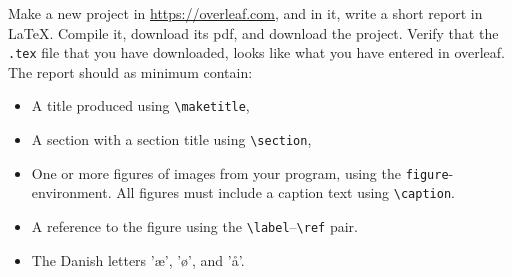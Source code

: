 Make a new project in \url{https://overleaf.com}, and in it, write a short report in \LaTeX. Compile it, download its pdf, and download the project. Verify that the \lstinline[language=console]{.tex} file that you have downloaded, looks like what you have entered in overleaf. The
report should as minimum contain:
\begin{itemize}
\item A title produced using \verb!\maketitle!, 
\item A section with a section title using \verb!\section!,
\item One or more figures of images from your program, using the
  \verb!figure!-environment. All figures must include a caption text
  using \verb!\caption!.
\item A reference to the figure using the
  \verb!\label!--\verb!\ref! pair.
\item The Danish letters 'æ', 'ø', and 'å'.
\end{itemize}
